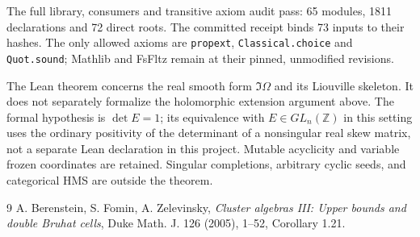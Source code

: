 \documentclass[11pt,a4paper]{article}
\begin{document}
The full library, consumers and transitive axiom audit pass: 65 modules,
1811 declarations and 72 direct roots. The committed receipt binds 73
inputs to their hashes. The only allowed axioms are
\nolinkurl{propext}, \nolinkurl{Classical.choice} and \nolinkurl{Quot.sound};
Mathlib and FsFltz remain at their pinned, unmodified revisions.

The Lean theorem concerns the real smooth form $\Im\Omega$ and its
Liouville skeleton. It does not separately formalize the holomorphic
extension argument above. The formal hypothesis is $\det E=1$; its
equivalence with $E\in GL_n(\mathbb Z)$ in this setting uses the ordinary
positivity of the determinant of a nonsingular real skew matrix, not a
separate Lean declaration in this project. Mutable acyclicity and
variable frozen coordinates are retained. Singular completions, arbitrary
cyclic seeds, and categorical HMS are outside the theorem.

\begin{thebibliography}{9}
 A. Berenstein, S. Fomin, A. Zelevinsky,
\emph{Cluster algebras III: Upper bounds and double Bruhat cells},
Duke Math. J. 126 (2005), 1--52, Corollary 1.21.
\end{thebibliography}
\end{document}
